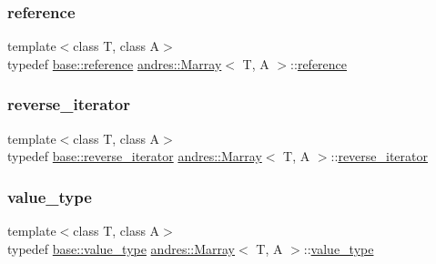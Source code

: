 \mbox{\label{classandres_1_1Marray_a20b76b3ff5480625dfad98caf0ec9649}} 
\subsubsection{\texorpdfstring{reference}{reference}}
{\footnotesize\ttfamily template$<$class T, class A$>$ \\
typedef \hyperlink{classandres_1_1View_aebdd1f19272b743b4422ff8ba18fc11a}{base\+::reference} \hyperlink{classandres_1_1Marray}{andres\+::\+Marray}$<$ T, A $>$\+::\hyperlink{classandres_1_1Marray_a20b76b3ff5480625dfad98caf0ec9649}{reference}}

\mbox{\label{classandres_1_1Marray_a9125dfa109e0a43ccd18081fd64ed65e}} 
\subsubsection{\texorpdfstring{reverse\+\_\+iterator}{reverse\_iterator}}
{\footnotesize\ttfamily template$<$class T, class A$>$ \\
typedef \hyperlink{classandres_1_1View_aab07af42756759420211d114bb705547}{base\+::reverse\+\_\+iterator} \hyperlink{classandres_1_1Marray}{andres\+::\+Marray}$<$ T, A $>$\+::\hyperlink{classandres_1_1Marray_a9125dfa109e0a43ccd18081fd64ed65e}{reverse\+\_\+iterator}}

\mbox{\label{classandres_1_1Marray_a902cba550c99fb1db7b6b95edb0ca4df}} 
\subsubsection{\texorpdfstring{value\+\_\+type}{value\_type}}
{\footnotesize\ttfamily template$<$class T, class A$>$ \\
typedef \hyperlink{classandres_1_1View_abe3d48ac2b0d65536e54dbfad0a44929}{base\+::value\+\_\+type} \hyperlink{classandres_1_1Marray}{andres\+::\+Marray}$<$ T, A $>$\+::\hyperlink{classandres_1_1Marray_a902cba550c99fb1db7b6b95edb0ca4df}{value\+\_\+type}}



